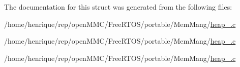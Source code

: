 The documentation for this struct was generated from the following files\-:\begin{DoxyCompactItemize}
\item 
/home/henrique/rep/open\-M\-M\-C/\-Free\-R\-T\-O\-S/portable/\-Mem\-Mang/\hyperlink{heap__2_8c}{heap\-\_.\-c}\item 
/home/henrique/rep/open\-M\-M\-C/\-Free\-R\-T\-O\-S/portable/\-Mem\-Mang/\hyperlink{heap__4_8c}{heap\-\_.\-c}\item 
/home/henrique/rep/open\-M\-M\-C/\-Free\-R\-T\-O\-S/portable/\-Mem\-Mang/\hyperlink{heap__5_8c}{heap\-\_.\-c}\end{DoxyCompactItemize}
